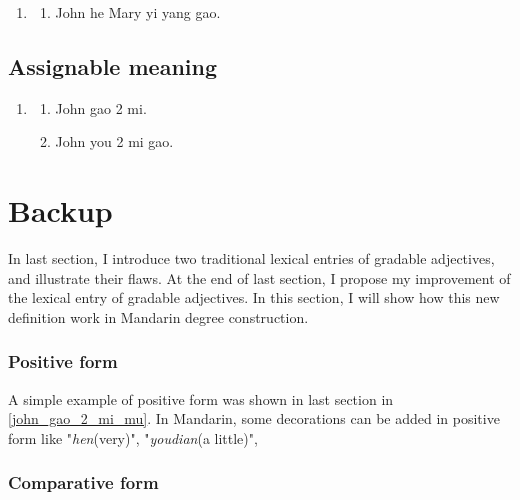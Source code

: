 \documentclass{ctexart}
\begin{document}
\begin{enumerate}[resume]
    \item
    \begin{enumerate}[ref=(\arabic{enumi}\alph*)]
        \item John he Mary yi yang gao.
    \end{enumerate}
\end{enumerate}

\subsection{Assignable meaning}

\begin{enumerate}[resume]
    \item
    \begin{enumerate}[ref=(\arabic{enumi}\alph*)]
        \item John gao 2 mi.
        \item John you 2 mi gao.
    \end{enumerate}
\end{enumerate}



















\section{Backup}


In last section, I introduce two traditional lexical entries of gradable adjectives, and illustrate their flaws. At the end of last section, I propose my improvement of the lexical entry of gradable adjectives. In this section, I will show how this new definition work in Mandarin degree construction.

\subsubsection{Positive form}

A simple example of positive form was shown in last section in \ref{john_gao_2_mi_mu}. In Mandarin, some decorations can be added in positive form like "\textit{hen}(very)", "\textit{youdian}(a little)", 


\subsubsection{Comparative form}
\end{document}
